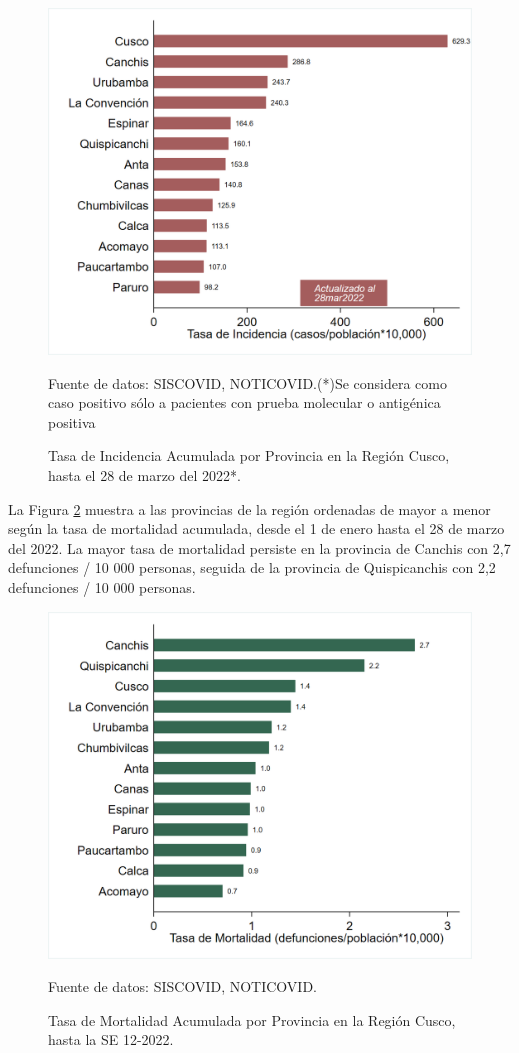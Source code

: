 \documentclass[12pt,a4paper,openany]{book}
\begin{document}
\begin{figure}[!htpb]
	\caption{Tasa de Incidencia Acumulada por Provincia en la Región Cusco, hasta el 28 de marzo del 2022*. }\label{fig:incidencia_provincias}
	\begin{center}
		\includegraphics[width=0.60\linewidth]{../figuras/incidencia_provincial_2022.png}
	\end{center}
	{\footnotesize {
	Fuente de datos: SISCOVID, NOTICOVID.(*)Se considera como caso positivo sólo a pacientes con prueba molecular o antigénica positiva}}
\end{figure}

La Figura \ref{fig:mortalidad_ordenada} muestra a las provincias de la región ordenadas de mayor a menor según la tasa de mortalidad acumulada, desde el 1 de enero hasta el 28 de marzo del 2022. La mayor tasa de mortalidad persiste en la provincia de Canchis con 2,7 defunciones / 10 000 personas, seguida de la provincia de Quispicanchis con 2,2 defunciones / 10 000 personas. 

\begin{figure}[h]
	\caption{Tasa de Mortalidad Acumulada por Provincia en la Región Cusco, hasta la SE 12-2022. }\label{fig:mortalidad_ordenada}
	\begin{center}
		\includegraphics[width=0.60\linewidth]{../figuras/mortalidad_provincial_2022.png}
	\end{center}
	{\footnotesize {Fuente de datos: SISCOVID, NOTICOVID.}}
\end{figure}
\end{document}
